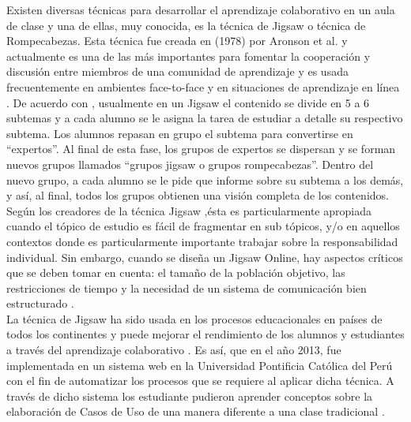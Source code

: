 Existen diversas técnicas para desarrollar el aprendizaje colaborativo en un aula de clase y una de ellas, muy conocida, es la técnica de Jigsaw o técnica de Rompecabezas. Esta técnica fue creada en (1978) por Aronson et al. y actualmente es una de las más importantes para fomentar la cooperación y discusión entre miembros de una comunidad de aprendizaje y es usada frecuentemente en ambientes face-to-face y en situaciones de aprendizaje en línea \cite{blocher_increasing_2005}. De acuerdo con \cite{aronson_jigsaw_1978}, usualmente en un Jigsaw el contenido se divide en 5 a 6 subtemas y a cada alumno se le asigna la tarea de estudiar a detalle su respectivo subtema. Los alumnos repasan en grupo el subtema para convertirse en “expertos”. Al final de esta fase, los grupos de expertos se dispersan y se forman nuevos grupos llamados “grupos jigsaw o grupos rompecabezas”. Dentro del nuevo grupo, a cada alumno se le pide que informe sobre su subtema a los demás, y así, al final, todos los grupos obtienen una visión completa de los contenidos.\\

Según los creadores de la técnica Jigsaw \cite{aronson_jigsaw_1978} ,ésta es particularmente apropiada cuando el tópico de estudio es fácil de fragmentar en sub tópicos, y/o en aquellos contextos donde es particularmente importante trabajar sobre la responsabilidad individual. Sin embargo, cuando se diseña un Jigsaw Online, hay aspectos críticos que se deben tomar en cuenta: el tamaño de la población objetivo, las restricciones de tiempo y la necesidad de un sistema de comunicación bien estructurado \cite{persico_pozzi_sarti_2008}.\\

La técnica de Jigsaw ha sido usada en los procesos educacionales en países de todos los continentes y puede mejorar el rendimiento de los alumnos y estudiantes a través del aprendizaje colaborativo  \cite{maftei_strengthen_2011}. Es así, que en el año 2013, fue implementada en un sistema web en la Universidad Pontificia Católica del Perú con el fin de automatizar los procesos que se requiere al aplicar dicha técnica. A través de dicho sistema los estudiante pudieron aprender conceptos sobre la elaboración de Casos de Uso de una manera diferente a una clase tradicional \cite{pinzas_desarrollo_2013}.\\



